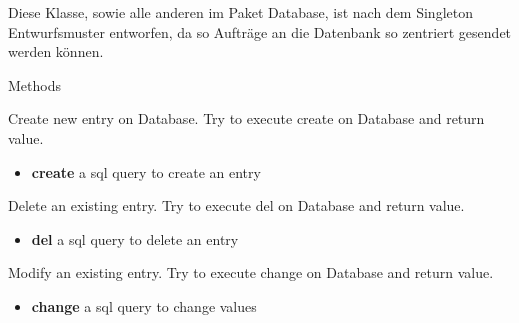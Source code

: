 Diese Klasse, sowie alle anderen im Paket Database, ist nach dem Singleton Entwurfsmuster entworfen, da so Aufträge an die Datenbank so zentriert gesendet werden können.

\begin{methodenv}{Methods}
	
	 Create new entry on Database. Try to execute create on Database and return value.
	
	\begin{itemize}
		\item \textbf{create} 
		a sql query to create an entry
	\end{itemize}
	
	 Delete an existing entry. Try to execute del on Database and return value.
	
	\begin{itemize}
		\item \textbf{del} 
		a sql query to delete an entry
	\end{itemize}
	
	 Modify an existing entry. Try to execute change on Database and return value.
	
	\begin{itemize}
		\item \textbf{change} 
		a sql query to change values
	\end{itemize}
	
\end{methodenv}

\newpage